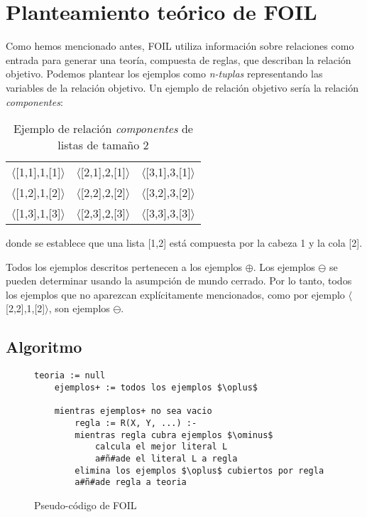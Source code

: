 \section{Planteamiento teórico de FOIL}\label{teoria}
Como hemos mencionado antes, FOIL utiliza información sobre relaciones como entrada para generar una teoría, compuesta de reglas, que describan la relación objetivo. Podemos plantear los ejemplos como \emph{n-tuplas} representando las variables de la relación objetivo. Un ejemplo de relación objetivo sería la relación \emph{componentes}:

\begin{table}[h]
  \setlength{\tabcolsep}{20pt} %
  \renewcommand{\arraystretch}{1.5}
  \centering
  \begin{tabular}{c c c}
  $\langle$[1,1],1,[1]$\rangle$ & $\langle$[2,1],2,[1]$\rangle$ & $\langle$[3,1],3,[1]$\rangle$ \\
  $\langle$[1,2],1,[2]$\rangle$ & $\langle$[2,2],2,[2]$\rangle$ & $\langle$[3,2],3,[2]$\rangle$ \\
  $\langle$[1,3],1,[3]$\rangle$ & $\langle$[2,3],2,[3]$\rangle$ & $\langle$[3,3],3,[3]$\rangle$ \\
  \end{tabular}
  \caption{Ejemplo de relación \emph{componentes} de listas de tamaño 2}
  \label{tab:tabla1}
\end{table}
donde se establece que una lista [1,2] está compuesta por la cabeza 1 y la cola [2].

Todos los ejemplos descritos pertenecen a los ejemplos $\oplus$. Los ejemplos $\ominus$ se pueden determinar usando la asumpción de mundo cerrado. Por lo tanto, todos los ejemplos que no aparezcan explícitamente mencionados, como por ejemplo $\langle$[2,2],1,[2]$\rangle$, son ejemplos $\ominus$.

\subsection{Algoritmo}
\begin{figure}
  \begin{lstlisting}[mathescape, escapechar=\#]
    teoria := null
    ejemplos+ := todos los ejemplos $\oplus$

    mientras ejemplos+ no sea vacio
        regla := R(X, Y, ...) :-
        mientras regla cubra ejemplos $\ominus$
            calcula el mejor literal L
            a#ñ#ade el literal L a regla
        elimina los ejemplos $\oplus$ cubiertos por regla
        a#ñ#ade regla a teoria
  \end{lstlisting}
  \caption{Pseudo-código de FOIL}
  \label{fig:figura1}
\end{figure}

